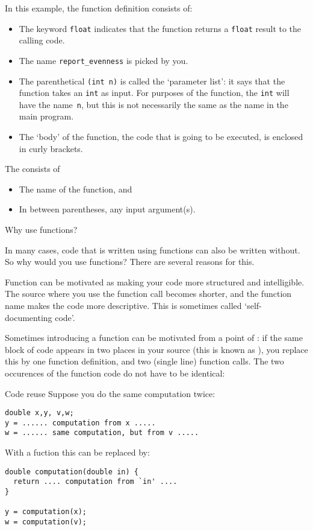 In this example, the function definition consists of:
\begin{itemize}
\item The  keyword \lstinline{float} indicates that the function 
  returns a \lstinline{float} result to the calling code.
\item The name \lstinline{report_evenness} is picked by you.
\item The parenthetical \lstinline{(int n)} is called the `parameter list': it
  says that the function takes an \lstinline{int} as input. For purposes of
  the function, the \lstinline{int} will have the name~\lstinline{n}, but this is not
  necessarily the same as the name in the main program.
\item The `body' of the function, the code that is going to be
  executed, is enclosed in curly brackets.
\end{itemize}

The  consists of
\begin{itemize}
\item The name of the function, and
\item In between parentheses, any input argument(s).
\end{itemize}

 {Why use functions?}

In many cases, code that is written using functions can also be
written without. So why would you use functions? There are several
reasons for this.

Function can be motivated as making your code more structured and intelligible.
The source where you use the function call becomes shorter,
and the function
name makes the code more descriptive. This is sometimes called
`self-documenting code'.

Sometimes introducing a function can be motivated from a point of
: if the same block of code appears in two
places in your source (this is known as
), you replace this by one function
definition, and two (single line) function calls.  The two occurences
of the function code do not have to be identical:


\begin{block}{Code reuse}
  \label{sl:reuse}
Suppose you do the same computation twice:
\begin{lstlisting}
double x,y, v,w;
y = ...... computation from x .....
w = ...... same computation, but from v .....
\end{lstlisting}
With a fuction this can be replaced by:
\begin{lstlisting}
double computation(double in) {
  return .... computation from `in' ....
}

y = computation(x);
w = computation(v);
\end{lstlisting}
\end{block}

